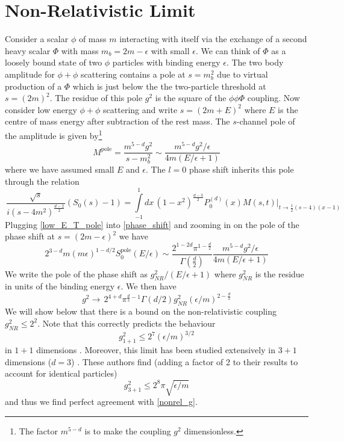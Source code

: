 \documentclass[12pt]{article}
\newcommand{\begBvR}[1]{\begin{#1}}
\newcommand{\beq}{\begBvR{equation}}
\newcommand{\eeq}{\end{equation}}
\newcommand{\la}[1]{\label{#1}}
\newcommand{\<}{{\langle}}
\renewcommand{\>}{{\rangle}}
\def\e{\epsilon}
\begin{document}
\section{Non-Relativistic Limit}\la{NR}
Consider a scalar $\phi$ of mass $m$ interacting with itself via the exchange of a second heavy scalar $\Phi$ with mass $m_{b}=2m-\epsilon$ with small $\epsilon$.  We can think of $\Phi$ as a loosely bound state of two $\phi$ particles with binding energy $\epsilon$. The two body amplitude for $\phi+\phi$ scattering contains a pole at $s=m_{b}^{2}$ due to virtual production of a $\Phi$ which is just below the the two-particle threshold at $s=(2m)^{2}$.  The residue of this pole $g^{2}$ is the square of the  $\phi\phi\Phi$ coupling. Now consider low energy $\phi+\phi$ scattering and write $s=(2m+E)^{2}$ where $E$ is the centre of mass energy after subtraction of the rest mass.  The $s$-channel pole of the amplitude is given by\footnote{The factor $m^{5-d}$ is to make the coupling $g^2$ dimensionless.}
\beq
M^{\text{pole}}=\frac{m^{5-d}g^{2}}{s-m_{b}^{2}}\sim \frac{m^{5-d}g^{2}/\e}{4m(E/\e+1)}\label{low_E_T_pole}
\eeq
where we have assumed small $E$ and $\e$.   The $l=0$ phase shift inherits this pole through the relation
\beq\label{phase_shift}
\, \frac{\sqrt{s}}{i (s-4m^{2})^{\frac{d-2}{2}}}(S_{0}(s)-1) =\int\limits_{-1}^1\! dx\, (1-x^2)^{\frac{d-3}{2}}P^{(d)}_0(x) \left. M(s, t)\right|_{t\to \tfrac{1}{2}(s-4) (x-1)}
\eeq
Plugging \eqref{low_E_T_pole} into \eqref{phase_shift} and zooming in on the pole of the phase shift at $s=(2m-\e)^{2}$ we have
\beq\label{phase_shift2}
2^{3-d}m (m \e)^{1-d/2} S^{\text{pole}}_{0}(E/\e) \sim \frac{2^{1-2 d} \pi ^{1-\frac{d}{2}}}{\Gamma \left(\frac{d}{2}\right)}  \frac{m^{5-d}g^{2}/\e}{4m(E/\e+1)}
\eeq
We write the pole of the phase shift as $g_{NR}^{2}/(E/\e+1)$ where $g_{NR}^{2}$ is the residue in units of the binding energy $\e$.  We then have
\beq\label{nonrel_g}
g^{2} \to \, 2^{4+d} \pi^{\frac{d}{2}-1}\Gamma(d/2) g_{NR}^{2} (\e/m)^{2-\frac{d}{2}} 
\eeq
We will show below that there is a bound on the non-relativistic coupling $g_{NR}^{2}\le 2^{2}$.  Note that this correctly predicts the behaviour
\beq
 g^{2}_{1+1}\le 2^{7} (\e/m)^{3/2} 
\eeq 
in $1+1$ dimensions \cite{paperII}.   Moreover, this limit has been studied extensively in $3+1$ dimensions ($d=3$) \cite{Ruderman1958,Gribov1961}.  These authors find (adding a factor of 2 to their results to account for identical particles)
\beq
g_{3+1}^{2}\le 2^{8} \pi \sqrt{\e/m}
\eeq 
and thus we find perfect agreement with \eqref{nonrel_g}.
\end{document}
